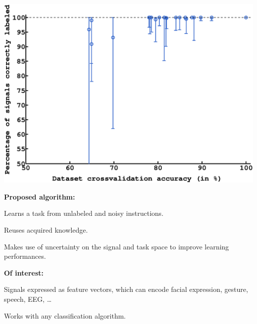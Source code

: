 \documentclass[a0,final, portrait]{inriaposter}
\begin{document}
\begin{multicols}{2}
{\begin{center}
\begin{minipage}{.02\columnwidth}
\begin{center}
	\end{center}
\end{minipage}
\begin{minipage}{.46\columnwidth}
\begin{center}
\includegraphics[width=\columnwidth]{images/plot_percent_label}	
\end{center}
\end{minipage}
\end{center}

}


{
\textbf{Proposed algorithm:}
\begin{inparaenum}
\item Learns a task from unlabeled and noisy instructions.
\item Reuses acquired knowledge.
\item Makes use of uncertainty on the signal and task space to improve learning performances.
\end{inparaenum}

\textbf{Of interest:}
\begin{inparaenum}
\item Signals expressed as feature vectors, which can encode facial expression, gesture, speech, EEG, \ldots
\item Works with any classification algorithm.
\end{inparaenum}
}

{
	\nocite{*}
	
	\renewcommand{\section}[2]{}%
	
	\vspace{-10pt}
}

\end{multicols}
\vfill
\end{document}

